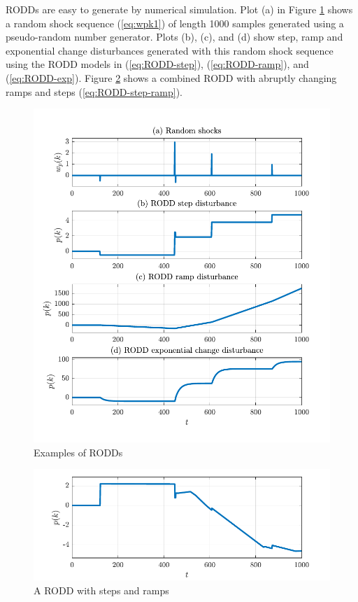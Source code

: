 \gls{RODD}s are easy to generate by numerical simulation.  Plot (a) in Figure \ref{fig:rodd-sim-plots} shows a random shock sequence (\ref{eq:wpk1}) of length 1000 samples generated using a pseudo-random number generator. Plots (b), (c), and (d) show step, ramp and exponential change disturbances generated with this random shock sequence using the \gls{RODD} models in (\ref{eq:RODD-step}), (\ref{eq:RODD-ramp}), and (\ref{eq:RODD-exp}). Figure \ref{fig:rodd-sim-plot2} shows a combined RODD with abruptly changing ramps and steps (\ref{eq:RODD-step-ramp}).
\begin{figure}[htp]
	\centering
	\includegraphics[width=13cm]{images/rodd_sim_plots.pdf}
	\caption{Examples of \gls{RODD}s}
	\label{fig:rodd-sim-plots}
\end{figure}
\begin{figure}[htp]
	\centering
	\includegraphics[width=13cm]{images/rodd_sim_plot2.pdf}
	\caption{A \gls{RODD} with steps and ramps}
	\label{fig:rodd-sim-plot2}
\end{figure}


